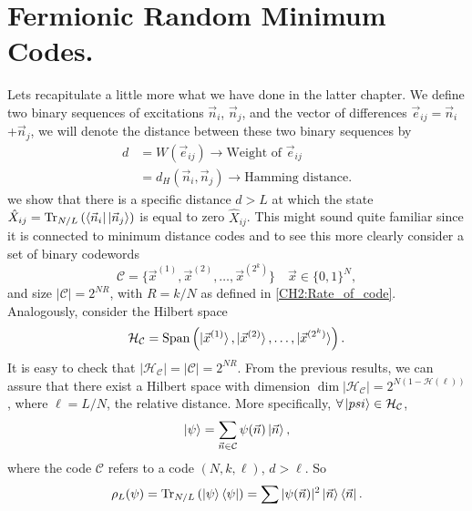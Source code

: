 \section{Fermionic Random Minimum Codes.}
Lets recapitulate a little more what we have done in the latter chapter. We define two binary sequences of excitations $\vec{n}_i$, $\vec{n}_j$, and the vector of differences $\vec{e}_{ij}=\vec{n}_i$+$\vec{n}_j$, we will denote the distance between these two binary sequences by
\begin{equation}
\begin{aligned}
d&=W(\vec{e}_{ij})\rightarrow \text{Weight of }\vec{e}_{ij} \\
&=d_{H}(\vec{n}_i, \vec{n}_j) \rightarrow \text{Hamming distance.}
\end{aligned}
\end{equation}
we show that there is a specific distance $d>L$ at which the state $\hat{X}_{ij}=\operatorname{Tr}_{N/L}\left(\mathinner{\langle{\vec{n}_i}|}\mathinner{|{\vec{n}_j}\rangle}\right)$ is equal to zero $\hat{X}_{ij}$. This might sound quite familiar since it is connected to minimum distance codes and to see this more clearly consider a set of binary codewords
\begin{equation}
\mathcal{C}=\{\vec{x}^{(1)},\vec{x}^{(2)},\ldots,\vec{x}^{(2^k)}\} \quad \vec{x}\in\{0,1\}^{N},
\end{equation}
and size $|\mathcal{C}|=2^{NR}$, with $R=k/N$ as defined in \eqref{CH2:Rate_of_code}. Analogously, consider the Hilbert space
\begin{equation}
\mathcal{H}_{\mathcal{C}}=\operatorname{Span}\left(\mathinner{|{\vec{x}^{(1)}}\rangle},\mathinner{|{\vec{x}^{(2)}}\rangle},\ldots,\mathinner{|{\vec{x}^{(2^k)}}\rangle}\right).
\end{equation}
\indent It is easy to check that $|\mathcal{H}_{\mathcal{C}}|=|\mathcal{C}|=2^{NR}$. From the previous results, we can assure that there exist a Hilbert space with dimension $\operatorname{dim}|\mathcal{H}_{\mathcal{C}}|=2^{N(1-\mathcal{H}(\ell))}$, where $\ell = L/N$, the relative distance. More specifically, $\forall \mathinner{|{psi}\rangle}\in \mathcal{H}_{\mathcal{C}}$,
\begin{equation}
\mathinner{|{\psi}\rangle} = \sum_{\vec{n}\in\mathcal{C}}\psi(\vec{n})\mathinner{|{\vec{n}}\rangle},
\end{equation}
where the code $\mathcal{C}$ refers to a code $(N,k,\ell)$, $d>\ell$. So 
\begin{equation}
\rho_{L}(\psi) = \operatorname{Tr}_{N/L}\left(\mathinner{|{\psi}\rangle}\mathinner{\langle{\psi}|}\right) = \sum |\psi(\vec{n})|^2 \mathinner{|{\vec{n}}\rangle}\mathinner{\langle{\vec{n}}|}.
\end{equation}
